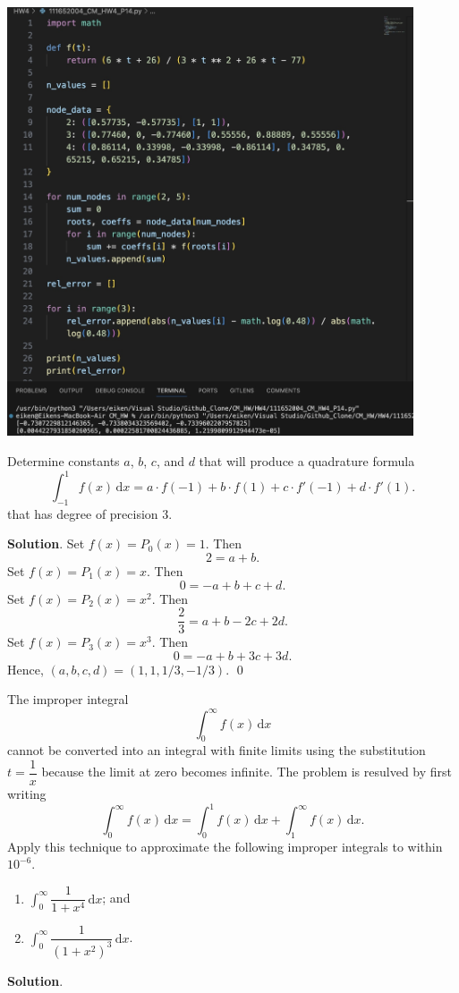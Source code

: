 \documentclass[11pt]{article}
\theoremstyle{break}
\newcommand{\ddi}{\text{$\,$d}}
\numberwithin{equation}{theorem}
\begin{document}
\begin{center}
    \includegraphics[width=0.9\textwidth]{P14.jpg}
\end{center}


\newpage
\begin{problem}\label{problem 15} %
    Determine constants $a$, $b$, $c$, and $d$ that will produce a quadrature formula $$\int_{-1}^{1}f(x)\ddi x=a\cdot f(-1)+b\cdot f(1)+c\cdot f'(-1)+d\cdot f'(1).$$ that has degree of precision $3$.
\end{problem}
\textbf{Solution}. Set $f(x)=P_0(x)=1$. Then $$2=a+b.$$ Set $f(x)=P_1(x)=x$. Then $$0=-a+b+c+d.$$ Set $f(x)=P_2(x)=x^2$. Then $$\dfrac{2}{3}=a+b-2c+2d.$$ Set $f(x)=P_3(x)=x^3$. Then $$0=-a+b+3c+3d.$$ Hence, $(a, b, c, d)=(1, 1, 1/3, -1/3)$. \qed


\newpage
\begin{problem}\label{problem 16} %
    The improper integral $$\int_{0}^{\infty}f(x)\ddi x$$ cannot be converted into an integral with finite limits using the substitution $t=\dfrac{1}{x}$ because the limit at zero becomes infinite. The problem is resulved by first writing $$\int_{0}^{\infty}f(x)\ddi x=\int_{0}^{1}f(x)\ddi x+\int_{1}^{\infty}f(x)\ddi x.$$ Apply this technique to approximate the following improper integrals to within $10^{-6}$. \vspace{-1em}
    \begin{multicols}{2}
        \begin{enumerate}
            \item $\displaystyle\int_{0}^{\infty}\dfrac{1}{1+x^4}\ddi x$; and
            \item $\displaystyle\int_{0}^{\infty}\dfrac{1}{(1+x^2)^3}\ddi x$.
        \end{enumerate}
    \end{multicols}
    \vspace{0.1em}
\end{problem}
\textbf{Solution}. 
\end{document}
